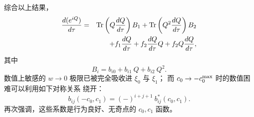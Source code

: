 综合以上结果，
\begin{eqnarray}
\frac{d(e^{i Q})}{d\tau}&=&\mbox{Tr}\left(Q\frac{dQ}{d\tau}\right) B_1
+\mbox{Tr}\left(Q^2\frac{dQ}{d\tau}\right) B_2\nonumber\\
&&+ f_1\frac{dQ}{d\tau}+f_2\frac{dQ}{d\tau}Q+f_2Q\frac{dQ}{d\tau},
\label{eq:dRdef}
\end{eqnarray}
其中
\begin{equation}
 B_i = b_{i0}+b_{i1}\ Q + b_{i2}\ Q^2.
\end{equation}
数值上敏感的 $w\rightarrow 0$ 极限已被完全吸收进 $\xi_0$ 与 $\xi_1$；
而 $c_0\rightarrow -c_0^{\rm max}$ 时的数值困难可以利用如下对称关系
绕开：
\begin{equation}
  b_{ij}(-c_0,c_1)=
  (-)^{i+j+1}\ b_{ij}^\ast(c_0,c_1). \label{eq:bsym}
\end{equation}
再次强调，这些系数是行为良好、无奇点的 $c_0,c_1$ 函数。

